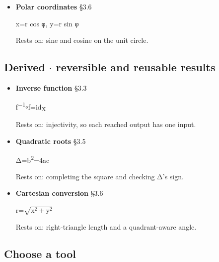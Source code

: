 \documentclass[11pt]{article}
\begin{document}
\begin{keepsection}
\begin{itemize}
(g\ensuremath{\circ}f)(x)=g(f(x))

Rests on: Im(f) fitting inside D(g).
\item {}
\textbf{Polar coordinates} \hfill{\small\color{FAUblue}§3.6}

x=r cos φ, y=r sin φ

Rests on: sine and cosine on the unit circle.
\end{itemize}

\subsection{Derived \ensuremath{\cdot} reversible and reusable results}

\begin{itemize}
\item {}
\textbf{Inverse function} \hfill{\small\color{FAUblue}§3.3}

f\textsuperscript{\ensuremath{-}1}\ensuremath{\circ}f=id\textsubscript{X}

Rests on: injectivity, so each reached output has one input.
\item {}
\textbf{Quadratic roots} \hfill{\small\color{FAUblue}§3.5}

Δ=b\textsuperscript{2}\ensuremath{-}4ac

Rests on: completing the square and checking Δ’s sign.
\item {}
\textbf{Cartesian conversion} \hfill{\small\color{FAUblue}§3.6}

r=\ensuremath{\sqrt{\mathrm{x}^{2}+\mathrm{y}^{2}}}

Rests on: right-triangle length and a quadrant-aware angle.
\end{itemize}

\begin{keepsection}
\subsection{Choose a tool}


\end{keepsection}
\end{keepsection}
\end{document}
